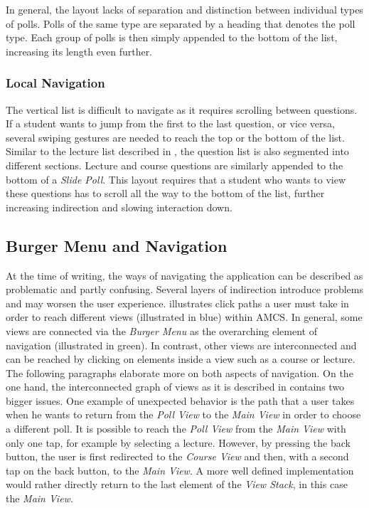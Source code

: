 In general, the layout lacks of separation and distinction between individual types of polls.
Polls of the same type are separated by a heading that denotes the poll type. Each group of polls is then simply appended to the bottom of the list, increasing its length even further.
\todogrf
\subsubsection{Local Navigation}

The vertical list is difficult to navigate as it requires scrolling between questions. If a student wants to jump from the first to the last question, or vice versa, several swiping gestures are needed to reach the top or the bottom of the list.
Similar to the lecture list described in , the question list is also segmented into different sections. Lecture and course questions are similarly appended to the bottom of a \emph{Slide Poll}. This layout requires that a student who wants to view these questions has to scroll all the way to the bottom of the list, further increasing indirection and slowing interaction down.



\subsection{Burger Menu and Navigation}
\label{section:con:problems:navigation}

At the time of writing, the ways of navigating the application can be described as problematic and partly confusing. Several layers of indirection introduce problems and may worsen the user experience.
 illustrates click paths a user must take in order to reach different views (illustrated in blue) within AMCS. In general, some views are connected via the \emph{Burger Menu} as the overarching element of navigation (illustrated in green). In contrast, other views are interconnected and can be reached by clicking on elements inside a view such as a course or lecture. The following paragraphs elaborate more on both aspects of navigation.
\newline
\newline
On the one hand, the interconnected graph of views as it is described in  contains two bigger issues. One example of unexpected behavior is the path that a user takes when he wants to return from the \emph{Poll View} to the \emph{Main View} in order to choose a different poll.
It is possible to reach the \emph{Poll View} from the \emph{Main View} with only one tap, for example by selecting a lecture.
However, by pressing the back button, the user is first redirected to the \emph{Course View} and then, with a second tap on the back button, to the \emph{Main View}. A more well defined implementation would rather directly return to the last element of the \emph{View Stack}, in this case the \emph{Main View}.
 
